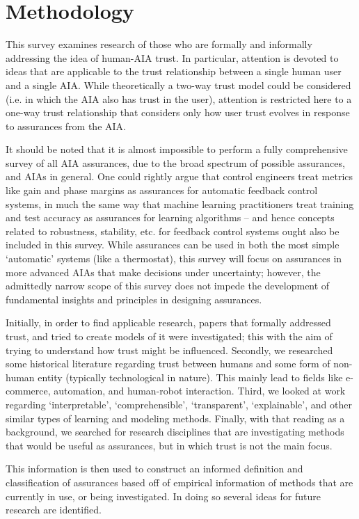 \section{Methodology} \label{sec:methodology}
    This survey examines research of those who are formally and informally addressing the idea of human-AIA trust. In particular, attention is devoted to ideas that are applicable to the trust relationship between a single human user and a single AIA. While theoretically a two-way trust model could be considered (i.e. in which the AIA also has trust in the user), attention is restricted here to a one-way trust relationship that considers only how user trust evolves in response to assurances from the AIA. 

    It should be noted that it is almost impossible to perform a fully comprehensive survey of all AIA assurances, due to the broad spectrum of possible assurances, and AIAs in general. One could rightly argue that control engineers treat metrics like gain and phase margins as assurances for automatic feedback control systems, in much the same way that  machine learning practitioners treat training and test accuracy as assurances for learning algorithms -- and hence concepts related to robustness, stability, etc. for feedback control systems ought also be included in this survey. While assurances can be used in both the most simple `automatic' systems (like a thermostat), this survey will focus on assurances in more advanced AIAs that make decisions under uncertainty; however, the admittedly narrow scope of this survey does not impede the development of fundamental insights and principles in designing assurances.

    Initially, in order to find applicable research, papers that formally addressed trust, and tried to create models of it were investigated; this with the aim of trying to understand how trust might be influenced. Secondly, we researched some historical literature regarding trust between humans and some form of non-human entity (typically technological in nature). This mainly lead to fields like e-commerce, automation, and human-robot interaction. Third, we looked at work regarding `interpretable', `comprehensible', `transparent', `explainable', and other similar types of learning and modeling methods. Finally, with that reading as a background, we searched for research disciplines that are investigating methods that would be useful as assurances, but in which trust is not the main focus.

    This information is then used to construct an informed definition and classification of assurances based off of empirical information of methods that are currently in use, or being investigated. In doing so several ideas for future research are identified.
